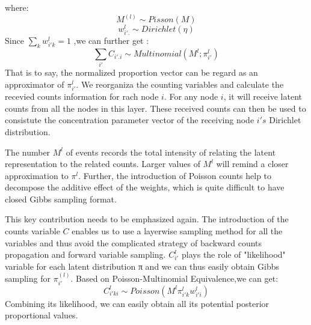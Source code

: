where:
$$
M^{(l)} \sim Pisson(M)
$$
\[
w_{i'.}^l \sim Dirichlet(\eta)
\]
Since $\sum_k w_{i'k}^l =1$ ,we can further get :
$$
\sum_{i'}{C_{i'.i}} \sim Multinomial(M^{l};\pi_{i'}^l)
$$
That is to say, the normalized proportion vector can be regard as an approximator of $\pi_{i'}^l$. We reorganiza the counting variables and calculate the recevied counts information for rach node $i$. For any node $i$, it will receive latent counts from all the nodes in this layer. These received counts can then be used to consistute the concentration parameter vector of the receiving node $i's$ Dirichlet distribution.

The number $M^{l}$ of events records the total intensity of relating the latent representation to the related counts. Larger
values of $M^{l}$ will remind a closer approximation to $\pi^{l}$. Further, the introduction of Poisson counts help to decompose the additive effect of the weights, which is quite difficult to have closed Gibbs sampling format.

This key contribution needs to be emphasized again. The
introduction of the counts variable $C$ enables us to use a
layerwise sampling method for all the variables and thus
avoid the complicated strategy of backward counts propagation and forward variable sampling. $C_{i'}^{{l}}$ plays the role of "likelihood" variable for each latent distribution π and we can thus easily obtain Gibbs sampling for $\pi_{i'}^{(l)}$.
 Based on Poisson-Multinomial Equivalence,we can get:
 $$C_{i'ki}^{l} \sim Poisson(M^l \pi_{i'k}^l w_{i'i}^l)\tag{3}$$
 Combining its likelihood, we can easily obtain all its potential posterior proportional
 values.


